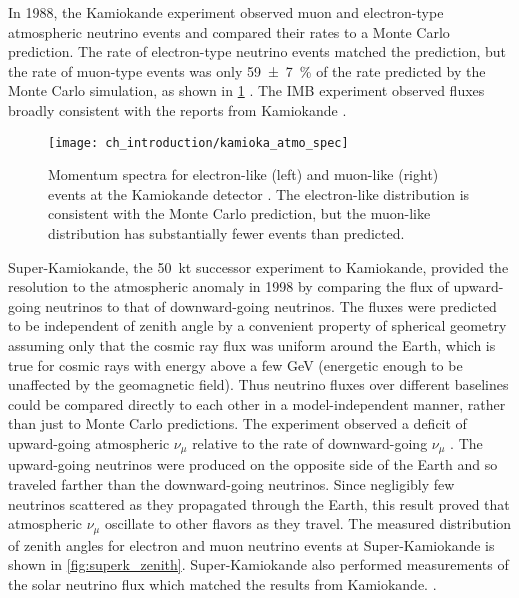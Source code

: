 In 1988, the Kamiokande experiment observed muon and electron-type
atmospheric neutrino events and compared their rates to a Monte Carlo prediction.
The rate of electron-type neutrino events matched the prediction,
but the rate of muon-type events was only \SI{59\pm7}{\percent}
of the rate predicted by the Monte Carlo simulation,
as shown in \cref{fig:kamioka_atmo} \cite{kamiokande_atmo}.
The IMB experiment observed fluxes broadly consistent with
the reports from Kamiokande \cite{imb_atmo}.

\begin{figure}
    \centering
    \texttt{[image: ch\_introduction/kamioka\_atmo\_spec]}
    \caption[Kamiokande atmospheric spectrum]{
        Momentum spectra for electron-like (left) and muon-like (right) events
        at the Kamiokande detector \cite{kamiokande_atmo}.
        The electron-like distribution is consistent with the Monte Carlo prediction,
        but the muon-like distribution has substantially fewer events
        than predicted.
    }
    \label{fig:kamioka_atmo}
\end{figure}

Super-Kamiokande, the \SI{50}{\kilo\tonne} successor experiment to Kamiokande,
provided the resolution
to the atmospheric anomaly in 1998
by comparing the flux of upward-going neutrinos
to that of downward-going neutrinos.
The fluxes were predicted to be independent of zenith angle
by a convenient property of spherical geometry
assuming only that the cosmic ray flux was uniform around the Earth,
which is true for cosmic rays with energy above a few \si{\GeV}
(energetic enough to be unaffected by the geomagnetic field).
Thus neutrino fluxes over different baselines
could be compared directly to each other
in a model-independent manner, rather than
just to Monte Carlo predictions.
The experiment observed a deficit of upward-going atmospheric $\nu_\mu$
relative to the rate of downward-going $\nu_\mu$ \cite{superk1998}.
The upward-going neutrinos were produced on the opposite side of the Earth
and so traveled farther than the downward-going neutrinos.
Since negligibly few neutrinos scattered as they propagated through the Earth,
this result proved that atmospheric $\nu_\mu$ oscillate to other flavors
as they travel.
The measured distribution of zenith angles for electron and muon neutrino events
at Super-Kamiokande is shown in \cref{fig:superk_zenith}.
Super-Kamiokande also performed measurements of the solar neutrino flux
which matched the results from Kamiokande.
\cite{superk_solar1998,superk_solar2001}.

